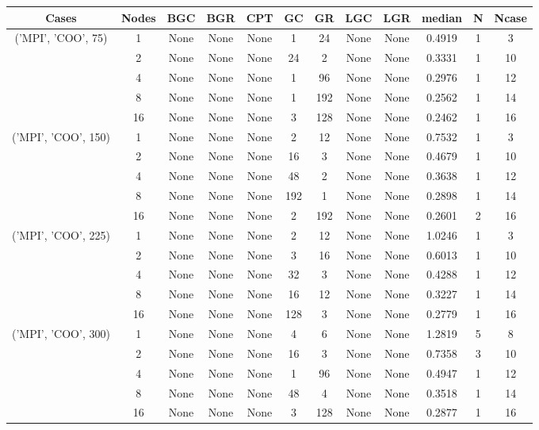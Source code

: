 \begin{tabular}{cccccccccccc}
\hline
Cases & Nodes& BGC& BGR& CPT& GC& GR& LGC& LGR& median & N & Ncase \\
\hline
\multirow{5}{*}{('MPI', 'COO', 75)}& 1& None& None& None& 1& 24& None& None& 0.4919& 1& 3\\
& 2& None& None& None& 24& 2& None& None& 0.3331& 1& 10\\
& 4& None& None& None& 1& 96& None& None& 0.2976& 1& 12\\
& 8& None& None& None& 1& 192& None& None& 0.2562& 1& 14\\
& 16& None& None& None& 3& 128& None& None& 0.2462& 1& 16\\
\hline
\multirow{5}{*}{('MPI', 'COO', 150)}& 1& None& None& None& 2& 12& None& None& 0.7532& 1& 3\\
& 2& None& None& None& 16& 3& None& None& 0.4679& 1& 10\\
& 4& None& None& None& 48& 2& None& None& 0.3638& 1& 12\\
& 8& None& None& None& 192& 1& None& None& 0.2898& 1& 14\\
& 16& None& None& None& 2& 192& None& None& 0.2601& 2& 16\\
\hline
\multirow{5}{*}{('MPI', 'COO', 225)}& 1& None& None& None& 2& 12& None& None& 1.0246& 1& 3\\
& 2& None& None& None& 3& 16& None& None& 0.6013& 1& 10\\
& 4& None& None& None& 32& 3& None& None& 0.4288& 1& 12\\
& 8& None& None& None& 16& 12& None& None& 0.3227& 1& 14\\
& 16& None& None& None& 128& 3& None& None& 0.2779& 1& 16\\
\hline
\multirow{5}{*}{('MPI', 'COO', 300)}& 1& None& None& None& 4& 6& None& None& 1.2819& 5& 8\\
& 2& None& None& None& 16& 3& None& None& 0.7358& 3& 10\\
& 4& None& None& None& 1& 96& None& None& 0.4947& 1& 12\\
& 8& None& None& None& 48& 4& None& None& 0.3518& 1& 14\\
& 16& None& None& None& 3& 128& None& None& 0.2877& 1& 16\\
\hline
\end{tabular}
